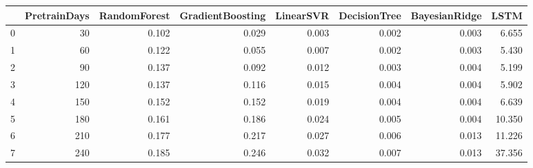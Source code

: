 \begin{tabular}{lrrrrrrr}
\toprule
{} &  PretrainDays &  RandomForest &  GradientBoosting &  LinearSVR &  DecisionTree &  BayesianRidge &   LSTM \\
\midrule
0 &            30 &         0.102 &             0.029 &      0.003 &         0.002 &          0.003 &  6.655 \\
1 &            60 &         0.122 &             0.055 &      0.007 &         0.002 &          0.003 &  5.430 \\
2 &            90 &         0.137 &             0.092 &      0.012 &         0.003 &          0.004 &  5.199 \\
3 &           120 &         0.137 &             0.116 &      0.015 &         0.004 &          0.004 &  5.902 \\
4 &           150 &         0.152 &             0.152 &      0.019 &         0.004 &          0.004 &  6.639 \\
5 &           180 &         0.161 &             0.186 &      0.024 &         0.005 &          0.004 & 10.350 \\
6 &           210 &         0.177 &             0.217 &      0.027 &         0.006 &          0.013 & 11.226 \\
7 &           240 &         0.185 &             0.246 &      0.032 &         0.007 &          0.013 & 37.356 \\
\bottomrule
\end{tabular}
